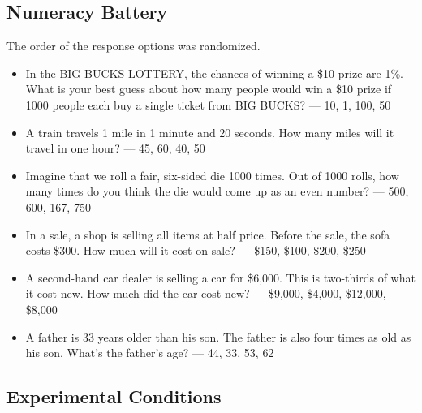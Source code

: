 \documentclass[12pt, letterpaper]{article}
\begin{document}
\subsection{Numeracy Battery}

The order of the response options was randomized.

\begin{itemize}
    \item In the BIG BUCKS LOTTERY, the chances of winning a \$10 prize are 1\%. What is your best guess about how many people would win a \$10 prize if 1000 people each buy a single ticket from BIG BUCKS? — 10, 1, 100, 50
    
    \item A train travels 1 mile in 1 minute and 20 seconds. How many miles will it travel in one hour? — 45, 60, 40, 50
    
    \item Imagine that we roll a fair, six-sided die 1000 times. Out of 1000 rolls, how many times do you think the die would come up as an even number? — 500, 600, 167, 750
    
    \item In a sale, a shop is selling all items at half price. Before the sale, the sofa costs \$300. How much will it cost on sale? — \$150, \$100, \$200, \$250
    
    \item A second-hand car dealer is selling a car for \$6,000. This is two-thirds of what it cost new. How much did the car cost new? — \$9,000, \$4,000, \$12,000, \$8,000
    
    \item A father is 33 years older than his son. The father is also four times as old as his son. What's the father’s age? — 44, 33, 53, 62
\end{itemize}

\subsection{Experimental Conditions}
\end{document}
